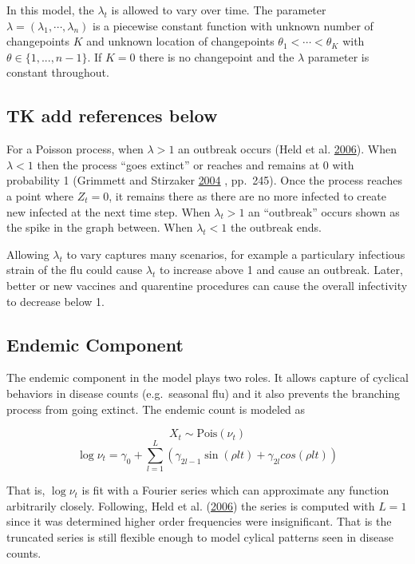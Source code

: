 \documentclass[11pt,a4paper]{article}
\numberwithin{equation}{section}
\begin{document}
In this model, the \(\lambda_t\) is allowed to vary over time. The
parameter \(\lambda = (\lambda_1,\cdots,\lambda_n)\) is a piecewise
constant function with unknown number of changepoints \(K\) and unknown
location of changepoints \(\theta_1 < \cdots < \theta_K\) with
\(\theta \in \{1,...,n-1\}\). If \(K = 0\) there is no changepoint and
the \(\lambda\) parameter is constant throughout.

\hypertarget{tk-add-references-below}{%
\subsection{TK add references below}\label{tk-add-references-below}}

For a Poisson process, when \(\lambda > 1\) an outbreak occurs (Held et
al. \protect\hyperlink{ref-held_two-component_2006}{2006}). When
\(\lambda < 1\) then the process ``goes extinct'' or reaches and remains
at 0 with probability 1 (Grimmett and Stirzaker
\protect\hyperlink{ref-grimmett_probability_2004}{2004} , pp.~245). Once
the process reaches a point where \(Z_t = 0\), it remains there as there
are no more infected to create new infected at the next time step. When
\(\lambda_t > 1\) an ``outbreak'' occurs shown as the spike in the graph
between. When \(\lambda_t < 1\) the outbreak ends.

Allowing \(\lambda_t\) to vary captures many scenarios, for example a
particulary infectious strain of the flu could cause \(\lambda_t\) to
increase above 1 and cause an outbreak. Later, better or new vaccines
and quarentine procedures can cause the overall infectivity to decrease
below 1.

\hypertarget{endemic-component}{%
\subsection{Endemic Component}\label{endemic-component}}

The endemic component in the model plays two roles. It allows capture of
cyclical behaviors in disease counts (e.g.~seasonal flu) and it also
prevents the branching process from going extinct. The endemic count is
modeled as

\[X_t \sim \text{Pois}(\nu_t)\]
\[\log{\nu_t} = \gamma_0 + \sum_{l = 1}^L (\gamma_{2l-1}\sin(\rho l t)+\gamma_{2l}cos(\rho l t))\]

That is, \(\log{\nu_t}\) is fit with a Fourier series which can
approximate any function arbitrarily closely. Following, Held et al.
(\protect\hyperlink{ref-held_two-component_2006}{2006}) the series is
computed with \(L = 1\) since it was determined higher order frequencies
were insignificant. That is the truncated series is still flexible
enough to model cylical patterns seen in disease counts.
\end{document}
